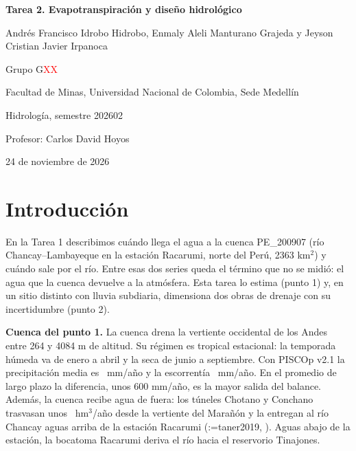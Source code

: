 \documentclass[12pt,a4paper]{article}
\makeatletter
\newcommand{\parencite}[2][]{(\@tempswafalse\@for\rk:=#2\do{\if@tempswa; \fi\@tempswatrue\csname rA@\rk\endcsname, \csname rY@\rk\endcsname}\ifx\relax#1\relax\else, #1\fi)}
\newcommand{\Grupo}{G\textcolor{red}{XX}}
\makeatother
\begin{document}
\sloppy

\begin{titlepage}
\centering
\vspace*{3cm}
{\bfseries Tarea 2. Evapotranspiración y diseño hidrológico}\par
\vspace{1.2cm}
Andrés Francisco Idrobo Hidrobo, Enmaly Aleli Manturano Grajeda y Jeyson Cristian Javier Irpanoca\par
\vspace{0.6cm}
Grupo \Grupo\par
\vspace{0.6cm}
Facultad de Minas, Universidad Nacional de Colombia, Sede Medellín\par
\vspace{0.6cm}
Hidrología, semestre 202602\par
Profesor: Carlos David Hoyos\par
\vspace{0.6cm}
24 de noviembre de 2026
\end{titlepage}

\tableofcontents
\newpage

\section{Introducción}

En la Tarea 1 describimos cuándo llega el agua a la cuenca PE\_200907 (río Chancay--Lambayeque en la estación Racarumi, norte del Perú, 2363 km$^2$) y cuándo sale por el río. Entre esas dos series queda el término que no se midió: el agua que la cuenca devuelve a la atmósfera. Esta tarea lo estima (punto 1) y, en un sitio distinto con lluvia subdiaria, dimensiona dos obras de drenaje con su incertidumbre (punto 2).

\textbf{Cuenca del punto 1.} La cuenca drena la vertiente occidental de los Andes entre 264 y 4084 m de altitud. Su régimen es tropical estacional: la temporada húmeda va de enero a abril y la seca de junio a septiembre. Con PISCOp v2.1 la precipitación media es \PL\ mm/año y la escorrentía \Qmed\ mm/año. En el promedio de largo plazo la diferencia, unos 600 mm/año, es la mayor salida del balance. Además, la cuenca recibe agua de fuera: los túneles Chotano y Conchano trasvasan unos \TrHmCen\ hm$^3$/año desde la vertiente del Marañón y la entregan al río Chancay aguas arriba de la estación Racarumi \parencite{taner2019}. Aguas abajo de la estación, la bocatoma Racarumi deriva el río hacia el reservorio Tinajones.
\end{document}
